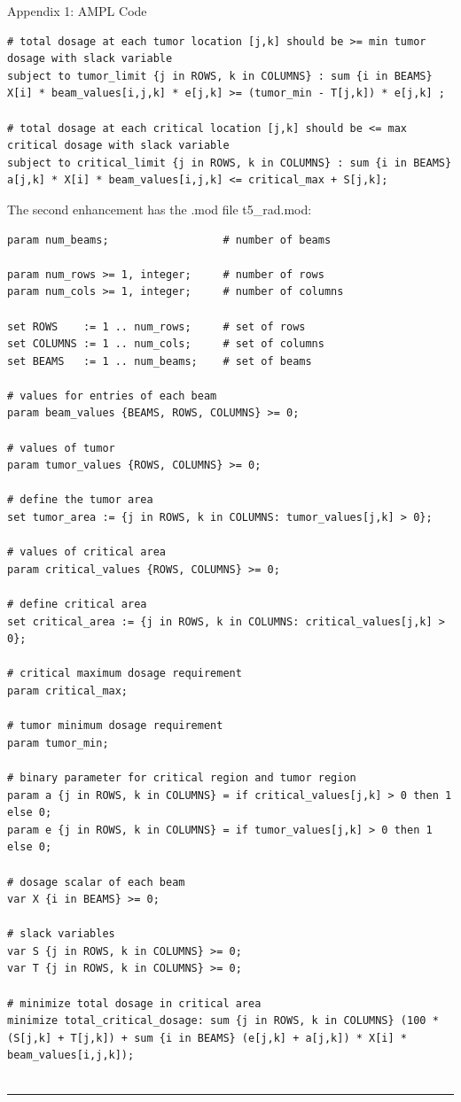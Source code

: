 \documentclass[12pt]{article}
\makeatletter
\newenvironment{task}{\@startsection
       {section}{1}
       {0.4em}{-.5ex plus -1ex minus -.2ex}{.5ex plus .2ex}
       {\pagebreak[3]\large\bf\noindent{Task}}}
       {\nopagebreak[3]\vspace{3ex}\begin{center}\rule{1\linewidth}{.3pt}\end{center}}
\makeatother
\begin{document}
\begin{task}{Appendix 1: AMPL Code}
\begin{enumerate}
\begin{lstlisting}
# total dosage at each tumor location [j,k] should be >= min tumor dosage with slack variable
subject to tumor_limit {j in ROWS, k in COLUMNS} : sum {i in BEAMS} X[i] * beam_values[i,j,k] * e[j,k] >= (tumor_min - T[j,k]) * e[j,k] ;

# total dosage at each critical location [j,k] should be <= max critical dosage with slack variable
subject to critical_limit {j in ROWS, k in COLUMNS} : sum {i in BEAMS} a[j,k] * X[i] * beam_values[i,j,k] <= critical_max + S[j,k];
\end{lstlisting}

The second enhancement has the .mod file t5\_rad.mod:

\begin{lstlisting}
param num_beams;                  # number of beams

param num_rows >= 1, integer;     # number of rows
param num_cols >= 1, integer;     # number of columns 

set ROWS    := 1 .. num_rows;	  # set of rows
set COLUMNS := 1 .. num_cols;	  # set of columns
set BEAMS   := 1 .. num_beams;    # set of beams

# values for entries of each beam
param beam_values {BEAMS, ROWS, COLUMNS} >= 0; 

# values of tumor
param tumor_values {ROWS, COLUMNS} >= 0; 

# define the tumor area 
set tumor_area := {j in ROWS, k in COLUMNS: tumor_values[j,k] > 0};

# values of critical area
param critical_values {ROWS, COLUMNS} >= 0; 

# define critical area 
set critical_area := {j in ROWS, k in COLUMNS: critical_values[j,k] > 0};

# critical maximum dosage requirement
param critical_max;

# tumor minimum dosage requirement
param tumor_min;

# binary parameter for critical region and tumor region
param a {j in ROWS, k in COLUMNS} = if critical_values[j,k] > 0 then 1 else 0;
param e {j in ROWS, k in COLUMNS} = if tumor_values[j,k] > 0 then 1 else 0;

# dosage scalar of each beam
var X {i in BEAMS} >= 0;

# slack variables
var S {j in ROWS, k in COLUMNS} >= 0;
var T {j in ROWS, k in COLUMNS} >= 0;

# minimize total dosage in critical area
minimize total_critical_dosage: sum {j in ROWS, k in COLUMNS} (100 * (S[j,k] + T[j,k]) + sum {i in BEAMS} (e[j,k] + a[j,k]) * X[i] * beam_values[i,j,k]);


\end{lstlisting}
\end{enumerate}
\end{task}
\end{document}
